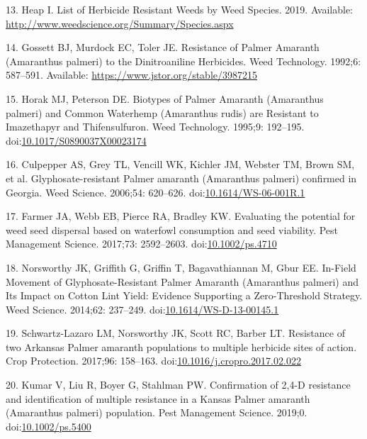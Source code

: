 \documentclass[10pt,letterpaper]{article}
\begin{document}
\leavevmode\hypertarget{ref-heap_list_2019-1}{}%
13. Heap I. List of Herbicide Resistant Weeds by Weed Species. 2019.
Available: \url{http://www.weedscience.org/Summary/Species.aspx}

\leavevmode\hypertarget{ref-gossett_resistance_1992}{}%
14. Gossett BJ, Murdock EC, Toler JE. Resistance of Palmer Amaranth
(Amaranthus palmeri) to the Dinitroaniline Herbicides. Weed Technology.
1992;6: 587--591. Available: \url{https://www.jstor.org/stable/3987215}

\leavevmode\hypertarget{ref-horak_biotypes_1995}{}%
15. Horak MJ, Peterson DE. Biotypes of Palmer Amaranth (Amaranthus
palmeri) and Common Waterhemp (Amaranthus rudis) are Resistant to
Imazethapyr and Thifensulfuron. Weed Technology. 1995;9: 192--195.
doi:\href{https://doi.org/10.1017/S0890037X00023174}{10.1017/S0890037X00023174}

\leavevmode\hypertarget{ref-culpepper_glyphosate-resistant_2006}{}%
16. Culpepper AS, Grey TL, Vencill WK, Kichler JM, Webster TM, Brown SM,
et al. Glyphosate-resistant Palmer amaranth (Amaranthus palmeri)
confirmed in Georgia. Weed Science. 2006;54: 620--626.
doi:\href{https://doi.org/10.1614/WS-06-001R.1}{10.1614/WS-06-001R.1}

\leavevmode\hypertarget{ref-farmer_evaluating_2017}{}%
17. Farmer JA, Webb EB, Pierce RA, Bradley KW. Evaluating the potential
for weed seed dispersal based on waterfowl consumption and seed
viability. Pest Management Science. 2017;73: 2592--2603.
doi:\href{https://doi.org/10.1002/ps.4710}{10.1002/ps.4710}

\leavevmode\hypertarget{ref-norsworthy_-field_2014}{}%
18. Norsworthy JK, Griffith G, Griffin T, Bagavathiannan M, Gbur EE.
In-Field Movement of Glyphosate-Resistant Palmer Amaranth (Amaranthus
palmeri) and Its Impact on Cotton Lint Yield: Evidence Supporting a
Zero-Threshold Strategy. Weed Science. 2014;62: 237--249.
doi:\href{https://doi.org/10.1614/WS-D-13-00145.1}{10.1614/WS-D-13-00145.1}

\leavevmode\hypertarget{ref-schwartz-lazaro_resistance_2017}{}%
19. Schwartz-Lazaro LM, Norsworthy JK, Scott RC, Barber LT. Resistance
of two Arkansas Palmer amaranth populations to multiple herbicide sites
of action. Crop Protection. 2017;96: 158--163.
doi:\href{https://doi.org/10.1016/j.cropro.2017.02.022}{10.1016/j.cropro.2017.02.022}

\leavevmode\hypertarget{ref-kumar_confirmation_2019}{}%
20. Kumar V, Liu R, Boyer G, Stahlman PW. Confirmation of 2,4-D
resistance and identification of multiple resistance in a Kansas Palmer
amaranth (Amaranthus palmeri) population. Pest Management Science.
2019;0. doi:\href{https://doi.org/10.1002/ps.5400}{10.1002/ps.5400}
\end{document}
